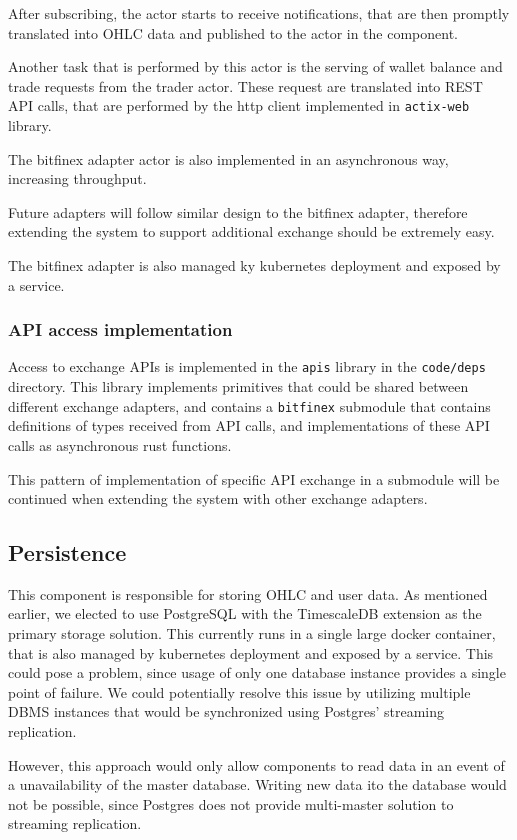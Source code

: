 After subscribing, the actor starts to receive notifications, that are then promptly translated into OHLC data
and published to the  actor in the  component.

Another task that is performed by this actor is the serving of wallet balance and trade requests from the
trader actor. These request are translated into REST API calls, that are performed by the http client implemented
in \verb|actix-web| library.

The bitfinex adapter actor is also implemented in an asynchronous way, increasing throughput.

Future adapters will follow similar design to the bitfinex adapter, therefore
extending the system to support additional exchange should be extremely easy.

The bitfinex adapter is also managed ky kubernetes deployment and exposed by a service.

\subsubsection{API access implementation}
Access to exchange APIs is implemented in the \verb|apis| library in the \verb|code/deps| directory. This library implements
primitives that could be shared between different exchange adapters, and contains a \verb|bitfinex| submodule that contains
definitions of types received from API calls, and implementations of these API calls as  asynchronous rust functions.

This pattern of implementation of specific API exchange in a submodule will be continued when extending the system
with other exchange adapters.


\subsection{Persistence}
This component is responsible for storing OHLC and user data. As mentioned earlier, we elected to use PostgreSQL
with the TimescaleDB extension as the primary storage solution. This currently runs in a single large docker
container, that is also managed by kubernetes deployment and exposed by a service. This could pose a problem,
since usage of only one database instance provides a single point of failure. We could potentially resolve
this issue by utilizing multiple DBMS instances that would be synchronized using Postgres' streaming replication.

However, this approach would only allow components to read data in an event of a unavailability of the master
database. Writing new data ito the database would not be possible, since Postgres does not provide multi-master
solution to streaming replication.

